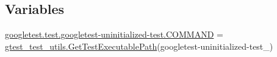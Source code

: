 \subsection*{Variables}
\begin{DoxyCompactItemize}
\item 
\mbox{\hyperlink{namespacegoogletest_1_1test_1_1googletest-uninitialized-test_a40aa089e8c55dbb2c5048c322bd1c5e1}{googletest.\+test.\+googletest-\/uninitialized-\/test.\+C\+O\+M\+M\+A\+ND}} = \mbox{\hyperlink{namespacegtest__test__utils_a89ed3717984a80ffbb7a9c92f71b86a2}{gtest\+\_\+test\+\_\+utils.\+Get\+Test\+Executable\+Path}}(\textquotesingle{}googletest-\/uninitialized-\/test\+\_\+\textquotesingle{})
\end{DoxyCompactItemize}
